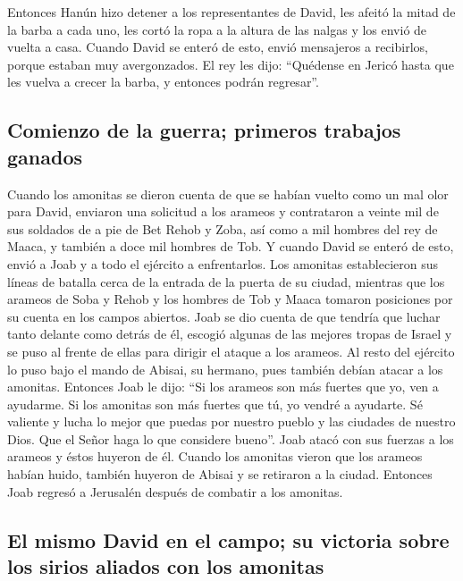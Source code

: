  Entonces Hanún hizo detener a los representantes de
David, les afeitó la mitad de la barba a cada uno, les cortó la ropa a
la altura de las nalgas y los envió de vuelta a casa. 
Cuando David se enteró de esto, envió mensajeros a recibirlos, porque
estaban muy avergonzados. El rey les dijo: ``Quédense en Jericó hasta
que les vuelva a crecer la barba, y entonces podrán regresar''.

\hypertarget{comienzo-de-la-guerra-primeros-trabajos-ganados}{%
\subsection{Comienzo de la guerra; primeros trabajos
ganados}\label{comienzo-de-la-guerra-primeros-trabajos-ganados}}

 Cuando los amonitas se dieron cuenta de que se habían
vuelto como un mal olor para David, enviaron una solicitud a los arameos
y contrataron a veinte mil de sus soldados de a pie de Bet Rehob y Zoba,
así como a mil hombres del rey de Maaca, y también a doce mil hombres de
Tob.  Y cuando David se enteró de esto, envió a Joab y a
todo el ejército a enfrentarlos.  Los amonitas
establecieron sus líneas de batalla cerca de la entrada de la puerta de
su ciudad, mientras que los arameos de Soba y Rehob y los hombres de Tob
y Maaca tomaron posiciones por su cuenta en los campos abiertos.
 Joab se dio cuenta de que tendría que luchar tanto
delante como detrás de él, escogió algunas de las mejores tropas de
Israel y se puso al frente de ellas para dirigir el ataque a los
arameos.  Al resto del ejército lo puso bajo el mando de
Abisai, su hermano, pues también debían atacar a los amonitas.
 Entonces Joab le dijo: ``Si los arameos son más fuertes
que yo, ven a ayudarme. Si los amonitas son más fuertes que tú, yo
vendré a ayudarte.  Sé valiente y lucha lo mejor que
puedas por nuestro pueblo y las ciudades de nuestro Dios. Que el Señor
haga lo que considere bueno''.  Joab atacó con sus
fuerzas a los arameos y éstos huyeron de él.  Cuando los
amonitas vieron que los arameos habían huido, también huyeron de Abisai
y se retiraron a la ciudad. Entonces Joab regresó a Jerusalén después de
combatir a los amonitas.

\hypertarget{el-mismo-david-en-el-campo-su-victoria-sobre-los-sirios-aliados-con-los-amonitas}{%
\subsection{El mismo David en el campo; su victoria sobre los sirios
aliados con los
amonitas}\label{el-mismo-david-en-el-campo-su-victoria-sobre-los-sirios-aliados-con-los-amonitas}}

